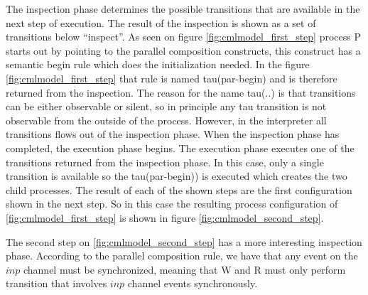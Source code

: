 \documentclass[a4paper, 10pt]{include/compassreport}   %
\begin{document}
The inspection phase determines the possible transitions that are
available in the next step of execution. The result of the inspection
is shown as a set of transitions below ``inspect''. As seen on figure
\autoref{fig:cmlmodel_first_step} process P starts out by pointing to
the parallel composition constructs, this construct has a semantic
begin rule which does the initialization needed. In the figure
\autoref{fig:cmlmodel_first_step} that rule is named tau(par-begin)
and is therefore returned from the inspection. The reason for the name
tau(..) is that transitions can be either observable or silent, so in
principle any tau transition is not observable from the outside of the
process. However, in the interpreter all transitions flows out of the
inspection phase. When the inspection phase has completed, the
execution phase begins. The execution phase executes one of the
transitions returned from the inspection phase. In this case, only a
single transition is available so the tau(par-begin)) is executed
which creates the two child processes. The result of each of the shown
steps are the first configuration shown in the next step. So in this
case the resulting process configuration of
\autoref{fig:cmlmodel_first_step} is shown in figure
\autoref{fig:cmlmodel_second_step}.


The second step on \autoref{fig:cmlmodel_second_step} has a more
interesting inspection phase. According to the parallel composition
rule, we have that any event on the $inp$ channel must be
synchronized, meaning that W and R must only perform transition that
involves $inp$ channel events synchronously.
\end{document}
